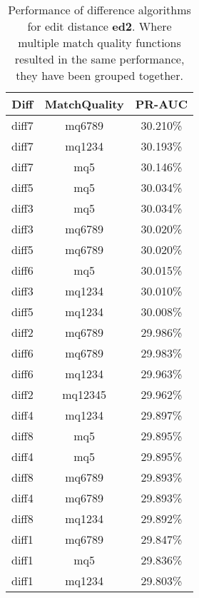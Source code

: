 \begin{table}[tbph]
\begin{center}
\begin{tabular}{|c|c||c|}
\hline
Diff & MatchQuality & PR-AUC  \\
\hline
\hline
diff7 & mq6789 & 30.210\% \\
diff7 & mq1234 & 30.193\% \\
diff7 & mq5 & 30.146\% \\
diff5 & mq5 & 30.034\% \\
diff3 & mq5 & 30.034\% \\
diff3 & mq6789 & 30.020\% \\
diff5 & mq6789 & 30.020\% \\
diff6 & mq5 & 30.015\% \\
diff3 & mq1234 & 30.010\% \\
diff5 & mq1234 & 30.008\% \\
diff2 & mq6789 & 29.986\% \\
diff6 & mq6789 & 29.983\% \\
diff6 & mq1234 & 29.963\% \\
diff2 & mq12345 & 29.962\% \\
diff4 & mq1234 & 29.897\% \\
diff8 & mq5 & 29.895\% \\
diff4 & mq5 & 29.895\% \\
diff8 & mq6789 & 29.893\% \\
diff4 & mq6789 & 29.893\% \\
diff8 & mq1234 & 29.892\% \\
diff1 & mq6789 & 29.847\% \\
diff1 & mq5 & 29.836\% \\
diff1 & mq1234 & 29.803\% \\
\hline
\end{tabular}
\end{center}
\caption[Comparison of diff algorithms using edit distance \textbf{ed2}]{
  Performance of difference algorithms for
  edit distance \textbf{ed2}.  Where multiple match
  quality functions resulted in the same performance, they
  have been grouped together.}
\label{tab:editlongbyed2}
\end{table}

